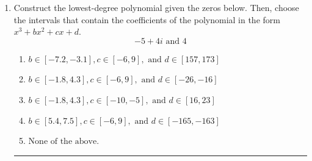 \documentclass[14pt]{extbook}
\newcommand{\litem}[1]{\item#1\hspace*{-1cm}\rule{\textwidth}{0.4pt}}
\begin{document}
\begin{enumerate}
{\begin{enumerate}[label=\Alph*.]
\end{enumerate} }
\litem{
Construct the lowest-degree polynomial given the zeros below. Then, choose the intervals that contain the coefficients of the polynomial in the form $x^3+bx^2+cx+d$.\[ -5 + 4 i \text{ and } 4 \]\begin{enumerate}[label=\Alph*.]
\item \( b \in [-7.2, -3.1], c \in [-6, 9], \text{ and } d \in [157, 173] \)
\item \( b \in [-1.8, 4.3], c \in [-6, 9], \text{ and } d \in [-26, -16] \)
\item \( b \in [-1.8, 4.3], c \in [-10, -5], \text{ and } d \in [16, 23] \)
\item \( b \in [5.4, 7.5], c \in [-6, 9], \text{ and } d \in [-165, -163] \)
\item \( \text{None of the above.} \)


\end{enumerate}}
\end{enumerate}
\end{document}
